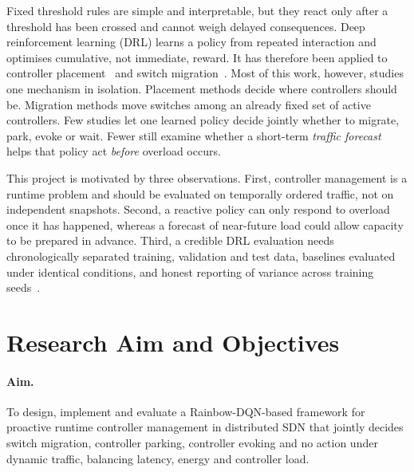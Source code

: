 Fixed threshold rules are simple and interpretable, but they react only after a threshold has been crossed and cannot weigh delayed consequences. Deep reinforcement learning (DRL) learns a policy from repeated interaction and optimises cumulative, not immediate, reward. It has therefore been applied to controller placement~\cite{bouzidi2022ddcp,chen2025mooo,farahi2026apdqn} and switch migration~\cite{yeo2021sarlb}. Most of this work, however, studies one mechanism in isolation. Placement methods decide where controllers should be. Migration methods move switches among an already fixed set of active controllers. Few studies let one learned policy decide jointly whether to migrate, park, evoke or wait. Fewer still examine whether a short-term \emph{traffic forecast} helps that policy act \emph{before} overload occurs.

This project is motivated by three observations. First, controller management is a runtime problem and should be evaluated on temporally ordered traffic, not on independent snapshots. Second, a reactive policy can only respond to overload once it has happened, whereas a forecast of near-future load could allow capacity to be prepared in advance. Third, a credible DRL evaluation needs chronologically separated training, validation and test data, baselines evaluated under identical conditions, and honest reporting of variance across training seeds~\cite{henderson2018matters,agarwal2021precipice}.

\section{Research Aim and Objectives}
\label{sec:objectives}

\paragraph{Aim.} To design, implement and evaluate a Rainbow-DQN-based framework for proactive runtime controller management in distributed SDN that jointly decides switch migration, controller parking, controller evoking and no action under dynamic traffic, balancing latency, energy and controller load.

